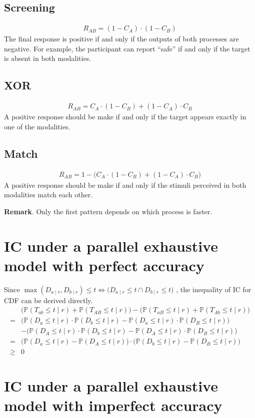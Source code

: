 \documentclass[a4paper,12pt]{article}
\begin{document}
\subsection{Screening}
\begin{align*}
R_{AB}=(1-C_A) \cdot (1-C_B)
\end{align*}
The final response is positive if and only if the outputs of both processes are negative. For example, the participant can report ``safe'' if and only if the target is absent in both modalities.

\subsection{XOR}
\begin{align*}
R_{AB}=C_A \cdot (1-C_B) + (1-C_A) \cdot C_B
\end{align*}
A positive response should be make if and only if the target appears exactly in one of the modalities. 

\subsection{Match}
\begin{align*}
R_{AB}=1-\big( C_A \cdot (1-C_B) + (1-C_A) \cdot C_B \big)
\end{align*}
A positive response should be make if and only if the stimuli perceived in both modalities match each other.

\par

\vspace{24pt}

\textbf{Remark}. Only the first pattern depends on which process is faster.

\section{IC under a parallel exhaustive model with perfect accuracy}
Since
$\max(D_{a \mid r}, D_{b \mid r}) \leq t \iff \big (D_{a \mid r} \leq t \cap D_{b \mid r} \leq t \big)$
, the inequality of IC for CDF can be derived directly.
\begin{align*}
& \big (\mathbb{P}(T_{ab} \leq t \mid r) + \mathbb{P}(T_{AB} \leq t \mid r) \big) - \big (\mathbb{P}(T_{aB} \leq t \mid r) + \mathbb{P}(T_{Ab} \leq t \mid r) \big) \\
=& \big(\mathbb{P}(D_a \leq t \mid r) \cdot \mathbb{P}(D_b \leq t \mid r) - \mathbb{P}(D_a \leq t \mid r) \cdot \mathbb{P}(D_B \leq t \mid r) \big) \\
& - \big(\mathbb{P}(D_A \leq t \mid r) \cdot \mathbb{P}(D_b \leq t \mid r) - \mathbb{P}(D_A \leq t \mid r) \cdot \mathbb{P}(D_B \leq t \mid r) \big) \\
=& \big(\mathbb{P}(D_a \leq t \mid r) - \mathbb{P}(D_A \leq t \mid r) \big) \cdot \big(\mathbb{P}(D_b \leq t \mid r) - \mathbb{P}(D_B \leq t \mid r) \big) \\
\geq & 0
\end{align*} 

\section{IC under a parallel exhaustive model with imperfect accuracy}
\end{document}
